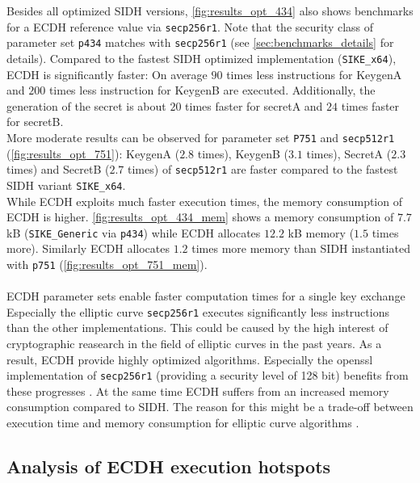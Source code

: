 Besides all optimized \gls{SIDH} versions, \autoref{fig:results_opt_434} also shows benchmarks for a \gls{ECDH} reference value via \texttt{secp256r1}. Note that the security class of parameter set \texttt{p434} matches with \texttt{secp256r1} (see \autoref{sec:benchmarks_details} for details). Compared to the fastest \gls{SIDH} optimized implementation (\texttt{SIKE\_x64}), \gls{ECDH} is significantly faster: On average $90$ times less instructions for KeygenA and $200$ times less instruction for KeygenB are executed. Additionally, the generation of the secret is about $20$ times faster for secretA and $24$ times faster for secretB.\\
More moderate results can be observed for parameter set \texttt{P751} and \texttt{secp512r1} (\autoref{fig:results_opt_751}): KeygenA ($2.8$ times),  KeygenB ($3.1$ times), SecretA ($2.3$ times) and SecretB ($2.7$ times) of \texttt{secp512r1} are faster compared to the fastest \gls{SIDH} variant \texttt{SIKE\_x64}.
\\
While \gls{ECDH} exploits much faster execution times, the memory consumption of \gls{ECDH} is higher.  \autoref{fig:results_opt_434_mem} shows a memory consumption of $7.7$ \gls{kB} (\texttt{SIKE\_Generic} via \texttt{p434}) while \gls{ECDH} allocates $12.2$ \gls{kB} memory ($1.5$ times more). Similarly \gls{ECDH} allocates $1.2$ times more memory than \gls{SIDH} instantiated with \texttt{p751} (\autoref{fig:results_opt_751_mem}).
\\\\
\gls{ECDH} parameter sets enable faster computation times for a single key exchange
Especially the elliptic curve \texttt{secp256r1} executes significantly less instructions than the other implementations. This could be caused by the high interest of cryptographic reasearch in the field of elliptic curves in the past years. As a result, \gls{ECDH} provide highly optimized algorithms. Especially the \gls{openssl} implementation of \texttt{secp256r1} (providing a security level of 128 bit) benefits from these progresses \parencite{adalier2015efficient}. At the same time \gls{ECDH} suffers from an increased memory consumption compared to \gls{SIDH}. The reason for this might be a trade-off between execution time and memory consumption for elliptic curve algorithms \parencite{adalier2015efficient}.

\subsection{Analysis of \gls{ECDH} execution hotspots}
\label{sec:analysis_ecdh_hotspots}

